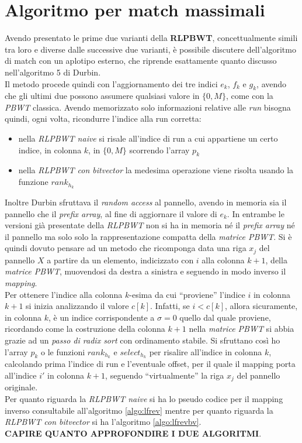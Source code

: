 \section{Algoritmo per match massimali}
Avendo presentato le prime due varianti della \textbf{RLPBWT}, concettualmente
simili tra loro e diverse dalle successive due varianti, è possibile discutere
dell'algoritmo di match con un aplotipo esterno, che riprende esattamente quanto
discusso nell'algoritmo 5 di Durbin.\\
Il metodo procede quindi con l'aggiornamento dei tre indici $e_k$, $f_k$ e
$g_k$, avendo che gli ultimi due possono assumere qualsiasi valore in $\{0,M\}$,
come con la \textit{PBWT} classica. Avendo memorizzato solo informazioni
relative alle \textit{run} bisogna quindi, ogni volta, ricondurre l'indice alla
run corretta:
\begin{itemize}
  \item nella \textit{RLPBWT naive} si risale all'indice di run a cui appartiene
  un certo indice, in colonna $k$, in $\{0,M\}$ scorrendo l'array $p_k$
  \item nella \textit{RLPBWT con bitvector} la medesima operazione viene risolta
  usando la funzione $rank_{h_k}$
\end{itemize}
Inoltre Durbin sfruttava il \textit{random access} al pannello, avendo in
memoria sia il pannello che il \textit{prefix array}, al fine di aggiornare il
valore di $e_k$. In entrambe le versioni già presentate della \textit{RLPBWT}
non si ha in memoria né il \textit{prefix array} né il pannello ma solo solo la
rappresentazione compatta della \textit{matrice PBWT}. Si è quindi dovuto
pensare ad un metodo che ricomponga data una riga $x_j$ del pannello $X$ a
partire da un elemento, indicizzato con $i$ alla colonna $k+1$, della
\textit{matrice PBWT}, muovendosi da destra a sinistra e seguendo in modo
inverso il \textit{mapping}.\\ 
Per ottenere l'indice alla colonna $k$-esima da cui ``proviene'' l'indice $i$ in
colonna $k+1$ si inizia analizzando il valore $c[k]$. Infatti, se $i<c[k]$,
allora sicuramente, in colonna $k$, è un indice corrispondente a $\sigma=0$
quello dal quale proviene, ricordando come la costruzione della colonna $k+1$
nella \textit{matrice PBWT} si abbia grazie ad un \textit{passo di radix sort}
con ordinamento stabile. Si sfruttano così ho l'array $p_k$ o le funzioni
$rank_{h_k}$ e $select_{h_k}$ per risalire all'indice in colonna $k$, calcolando
prima l'indice di run e l'eventuale offset, per il quale il mapping porta
all'indice $i'$ in colonna $k+1$, seguendo ``virtualmente'' la riga $x_j$ del
pannello originale.\\
Per quanto riguarda la \textit{RLPBWT naive} si ha lo pseudo codice per il
mapping inverso consultabile all'algoritmo \ref{algo:lfrev} mentre per quanto
riguarda la \textit{RLPBWT con bitvector} si ha l'algoritmo
\ref{algo:lfrevbv}.\\
\textbf{CAPIRE QUANTO APPROFONDIRE I DUE ALGORITMI}.\\

